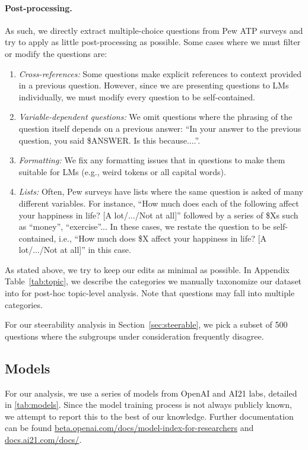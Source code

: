 \paragraph{Post-processing.}
As such, we directly extract multiple-choice questions from Pew ATP surveys and try to apply as little post-processing as possible. Some cases where we must filter or modify the questions are:
\begin{enumerate}
\item \emph{Cross-references:} Some questions make explicit references to context provided in a previous question. However, since we are presenting questions to LMs individually, we must modify every question to be self-contained. 
\item \emph{Variable-dependent questions:} We omit questions  where the phrasing of the question itself depends on a previous answer: ``In your answer to the previous question, you said \$ANSWER. Is this because....''. 
\item \emph{Formatting:} We fix any formatting issues that in questions to make them suitable for LMs (e.g., weird tokens or all capital words).
\item \emph{Lists:} Often, Pew surveys have lists where the same question is asked of many different variables. For instance, ``How much does each of the following affect your happiness in life? [A lot/.../Not at all]'' followed by a series of \$Xs such as ``money'', ``exercise''... In these cases, we restate the question to be self-contained, i.e., ``How much does \$X affect your happiness in life? [A lot/.../Not at all]'' in this case.
\end{enumerate}

As stated above, we try to keep our edits as minimal as possible.
In Appendix Table~\ref{tab:topic}, we describe the categories we manually taxonomize our dataset into for post-hoc topic-level analysis.
Note that questions may fall into multiple categories.






For our steerability analysis in Section~\ref{sec:steerable}, we pick a subset of 500 questions where the subgroups under consideration frequently disagree.

\clearpage



\subsection{Models}
\label{app:models}
For our analysis, we use a series of models from OpenAI and AI21 labs, detailed in \ref{tab:models}.
Since the model training process is not always publicly known, we attempt to report this to the best of our knowledge.
Further documentation can be found \url{beta.openai.com/docs/model-index-for-researchers} and \url{docs.ai21.com/docs/}.


